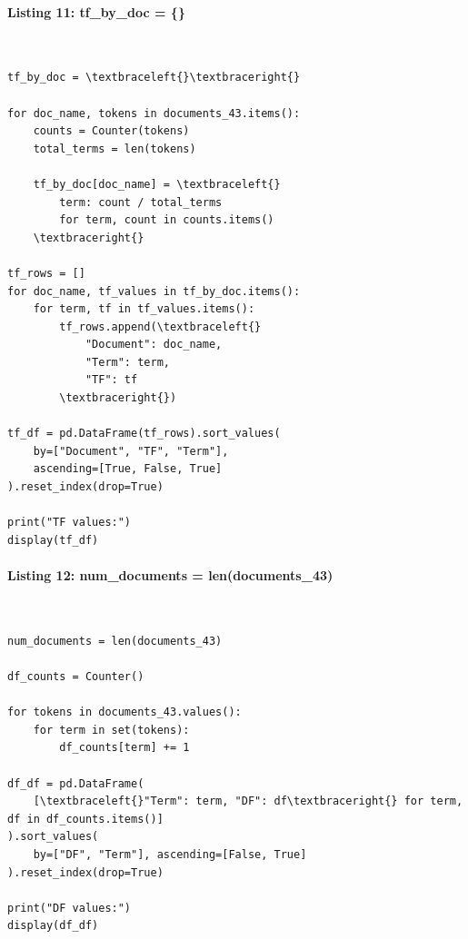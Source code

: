 \documentclass[12pt,a4paper,oneside]{report}
\begin{document}
\paragraph{Listing 11: tf\_by\_doc = \{\}}\mbox{}\\[-1ex]
\begin{Verbatim}[commandchars=\\\{\},breaklines=true,breakanywhere=true,fontsize=\scriptsize,frame=leftline,framesep=2mm,rulecolor=\color{gray}]
tf_by_doc = \textbraceleft{}\textbraceright{}

for doc_name, tokens in documents_43.items():
    counts = Counter(tokens)
    total_terms = len(tokens)

    tf_by_doc[doc_name] = \textbraceleft{}
        term: count / total_terms
        for term, count in counts.items()
    \textbraceright{}

tf_rows = []
for doc_name, tf_values in tf_by_doc.items():
    for term, tf in tf_values.items():
        tf_rows.append(\textbraceleft{}
            "Document": doc_name,
            "Term": term,
            "TF": tf
        \textbraceright{})

tf_df = pd.DataFrame(tf_rows).sort_values(
    by=["Document", "TF", "Term"],
    ascending=[True, False, True]
).reset_index(drop=True)

print("TF values:")
display(tf_df)
\end{Verbatim}
\paragraph{Listing 12: num\_documents = len(documents\_43)}\mbox{}\\[-1ex]
\begin{Verbatim}[commandchars=\\\{\},breaklines=true,breakanywhere=true,fontsize=\scriptsize,frame=leftline,framesep=2mm,rulecolor=\color{gray}]
num_documents = len(documents_43)

df_counts = Counter()

for tokens in documents_43.values():
    for term in set(tokens):
        df_counts[term] += 1

df_df = pd.DataFrame(
    [\textbraceleft{}"Term": term, "DF": df\textbraceright{} for term, df in df_counts.items()]
).sort_values(
    by=["DF", "Term"], ascending=[False, True]
).reset_index(drop=True)

print("DF values:")
display(df_df)
\end{Verbatim}
\end{document}
